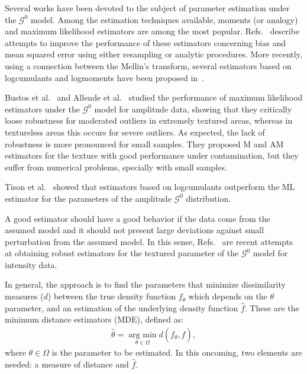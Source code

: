 \documentclass[twocolumn]{svjour3}
\newcommand{\argmin}{\operatorname*{\text{arg min }}}
\begin{document}
Several works have been devoted to the subject of parameter estimation under the $\mathcal{G}^0$ model. 
Among the estimation techniques available, moments (or analogy) and maximum likelihood estimators are among the most popular. 
Refs.~\cite{VasconcellosFrerySilva:CompStat,CribariFrerySilva:CSDA} describe attempts to improve the performance of these estimators concerning bias and mean squared error using either resampling or analytic procedures. More recently, using a connection between the Mellin's transform, several estimators based on logcumulants and logmoments have been proposed in~\cite{MellinAnalysisPolSAR,BujorTrouveValetNicolas2004,khan2014}. 

Bustos et al.~\cite{BustosFreryLucini:Mestimators:2001} and
Allende et al.~\cite{AllendeFreryetal:JSCS:05} studied the performance of maximum likelihood estimators under the $\mathcal{G}^{0}$ model for amplitude data, showing that they critically loose robustness for moderated outliers in extremely textured areas, whereas in textureless areas this occurs for severe outliers.
As expected, the lack of robustness is more pronounced for small samples. 
They proposed M and AM estimators for the texture with good performance under contamination, but they suffer from numerical problems, specially with small samples.

Tison et al.~\cite{Tison2004} showed that estimators based on logcumulants outperform the ML estimator for the parameters of the amplitude $\mathcal G^0$ distribution.

A good estimator should have a good behavior if the data come from the assumed model and it should not present large deviations against small perturbation from the assumed model.
In this sense, Refs.~\cite{APSAR2013ParameterEstimationStochasticDistances,gambini2015} are recent attempts at obtaining robust estimators for the textured parameter of the $\mathcal{G}^0$ model for intensity data.

In general, the approach is to find the parameters that minimize dissimilarity measures ($d$) between the true density function $f_{\theta}$ which depends on the $\theta$ parameter, and an estimation of the underlying density function $\widehat{f}$. 
These are the minimum distance estimators (MDE), defined as:
\begin{align}
\label{MDEGeneral}
\widehat{\theta}=
\argmin_{\theta\in\Omega}
d(f_{\theta}, \widehat{f}),
\end{align}
where $\theta\in\Omega$ is the parameter to be estimated. In this oncoming, two elements are needed: a measure of distance and $\widehat{f}$.
\end{document}
